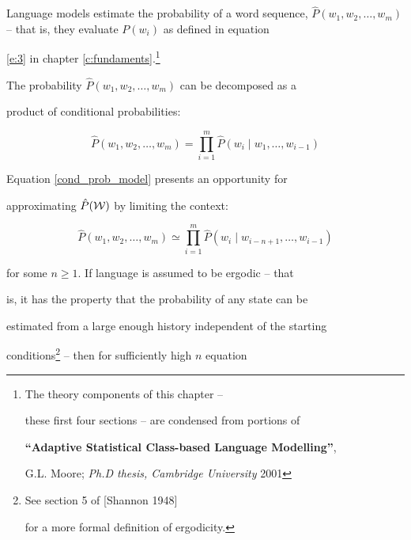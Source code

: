 

Language models estimate the probability of a word sequence, $\hat


P(w_1, w_2, \ldots, w_m)$ -- that is, they evaluate $P(w_i)$ as defined in equation


\ref{e:3} in chapter \ref{c:fundaments}.\footnote{The theory components of this chapter --


these first four sections -- are condensed from portions of


{\textbf{``Adaptive Statistical Class-based Language Modelling''},


G.L. Moore; \textit{Ph.D thesis, Cambridge University} 2001}}





The probability $\hat P(w_1, w_2, \ldots, w_m)$ can be decomposed as a


product of conditional probabilities:


\begin{equation}


\hat P(w_1, w_2, \ldots, w_m) = \prod_{i=1}^{m} \hat P(w_i \;|\; w_1,


\ldots, w_{i-1})\label{cond_prob_model}


\end{equation}










Equation \ref{cond_prob_model} presents an opportunity for


approximating $\hat{P}(\cal{W})$ by limiting the context:


\begin{equation}


\hat P(w_1, w_2, \ldots, w_m) \simeq \prod_{i=1}^{m} \hat P(w_i \;|\; w_{i-n+1},


\ldots, w_{i-1})\label{ngram_model}


\end{equation}


for some $n \geqslant 1$. If language is assumed to be ergodic -- that


is, it has the property that the probability of any state can be


estimated from a large enough history independent of the starting


conditions\footnote{See section 5 of [Shannon 1948]


for a more formal definition of ergodicity.} -- then for sufficiently high $n$ equation


